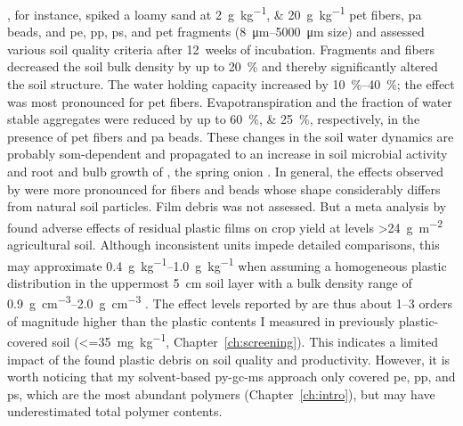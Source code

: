 , for instance, spiked a loamy sand at \SIlist{2;20}{\gram\per\kilo\gram} \ac{pet} fibers, \ac{pa} beads, and \ac{pe}, \ac{pp}, \ac{ps}, and \ac{pet} fragments (\SIrange{8}{5000}{\micro\meter} size) and assessed various soil quality criteria after \SI{12}{weeks} of incubation. Fragments and fibers decreased the soil bulk density by up to \SI{20}{\percent} and thereby significantly altered the soil structure. The water holding capacity increased by \SIrange{10}{40}{\percent}; the effect was most pronounced for \ac{pet} fibers. Evapotranspiration and the fraction of water stable aggregates were reduced by up to \SIlist{60;25}{\percent}, respectively, in the presence of \ac{pet} fibers and \ac{pa} beads. These changes in the soil water dynamics are probably \ac{som}-dependent \citep{ZhangVariations2020,LiangEffects2021} and propagated to an increase in soil microbial activity and root and bulb growth of , the spring onion \citep{deSouzaMachadoMicroplastics2019}. In general, the effects observed by \citet{deSouzaMachadoMicroplastics2019} were more pronounced for fibers and beads whose shape considerably differs from natural soil particles. Film debris was not assessed. But a meta analysis by \citet{GaoEffects2019} found adverse effects of residual plastic films on crop yield at levels \SI{>24}{\gram\per\square\meter} agricultural soil. Although inconsistent units impede detailed comparisons, this may approximate \SIrange{0.4}{1.0}{\gram\per\kilo\gram} when assuming a homogeneous plastic distribution in the uppermost \SI{5}{\centi\meter} soil layer with a bulk density range of \SIrange{0.9}{2.0}{\gram\per\cubic\centi\meter} \citep{HornPhysical2016}.
The effect levels reported by \citet{deSouzaMachadoMicroplastics2019,GaoEffects2019} are thus about \numrange{1}{3} orders of magnitude higher than the plastic contents I measured in previously plastic-covered soil (\SI{<=35}{\milli\gram\per\kilo\gram}, Chapter~\ref{ch:screening}). This indicates a limited impact of the found plastic debris on soil quality and productivity. However, it is worth noticing that my solvent-based \ac{py-gc-ms} approach only covered \ac{pe}, \ac{pp}, and \ac{ps}, which are the most abundant polymers (Chapter~\ref{ch:intro}), but may have underestimated total polymer contents.

